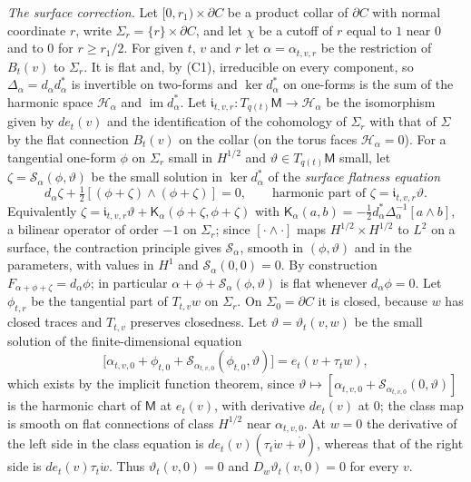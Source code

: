 \documentclass[11pt]{amsart}
\theoremstyle{definition}
\theoremstyle{remark}
\theoremstyle{plain}
\numberwithin{equation}{section}
\newcommand{\Msf}{\mathsf{M}}
\begin{document}
\emph{The surface correction.} Let $[0,r_1)\times\partial C$ be a product collar of $\partial C$
with normal coordinate $r$, write $\Sigma_r=\{r\}\times\partial C$, and let $\chi$ be a cutoff of
$r$ equal to $1$ near $0$ and to $0$ for $r\ge r_1/2$. For given $t$, $v$ and $r$ let
$\alpha=\alpha_{t,v,r}$ be the restriction of $B_t(v)$ to $\Sigma_r$. It is flat and, by (C1),
irreducible on every component, so $\Delta_\alpha=d_\alpha d_\alpha^*$ is invertible on
two-forms and $\ker d_\alpha^*$ on one-forms is the sum of the harmonic space $\mathcal H_\alpha$
and $\operatorname{im}d_\alpha^*$. Let $\mathfrak i_{t,v,r}\colon T_{q(t)}\Msf\to\mathcal H_\alpha$ be the
isomorphism given by $de_t(v)$ and the identification of the cohomology of $\Sigma_r$ with that
of $\Sigma$ by the flat connection $B_t(v)$ on the collar (on the torus faces $\mathcal
H_\alpha=0$). For a tangential one-form $\phi$ on $\Sigma_r$ small in $H^{1/2}$ and
$\vartheta\in T_{q(t)}\Msf$ small, let $\zeta=\mathcal S_\alpha(\phi,\vartheta)$ be the small
solution in $\ker d^*_\alpha$ of the \emph{surface flatness equation}
\begin{equation}\label{eq:surface-flatness}
d_\alpha\zeta+\tfrac12[(\phi+\zeta)\wedge(\phi+\zeta)]=0,\qquad
\text{harmonic part of }\zeta=\mathfrak i_{t,v,r}\vartheta .
\end{equation}
Equivalently $\zeta=\mathfrak i_{t,v,r}\vartheta+\mathsf K_\alpha(\phi+\zeta,\phi+\zeta)$ with
$\mathsf K_\alpha(a,b)=-\frac12d_\alpha^*\Delta_\alpha^{-1}[a\wedge b]$, a bilinear operator of order
$-1$ on $\Sigma_r$; since $[\cdot\wedge\cdot]$ maps $H^{1/2}\times H^{1/2}$ to $L^2$ on a
surface, the contraction principle gives $\mathcal S_\alpha$, smooth in $(\phi,\vartheta)$ and in
the parameters, with values in $H^1$ and $\mathcal S_\alpha(0,0)=0$. By construction
$F_{\alpha+\phi+\zeta}=d_\alpha\phi$; in particular $\alpha+\phi+\mathcal S_\alpha(\phi,\vartheta)$ is
flat whenever $d_\alpha\phi=0$. Let $\phi_{t,r}$ be the tangential part of $T_{t,v}w$ on
$\Sigma_r$. On $\Sigma_0=\partial C$ it is closed, because $w$ has closed traces and $T_{t,v}$
preserves closedness. Let $\vartheta=\vartheta_t(v,w)$ be the small solution of the
finite-dimensional equation
\begin{equation}\label{eq:class-equation}
\bigl[\alpha_{t,v,0}+\phi_{t,0}+\mathcal S_{\alpha_{t,v,0}}(\phi_{t,0},\vartheta)\bigr]=e_t(v+\tau_tw),
\end{equation}
which exists by the implicit function theorem, since $\vartheta\mapsto[\alpha_{t,v,0}+\mathcal
S_{\alpha_{t,v,0}}(0,\vartheta)]$ is the harmonic chart of $\Msf$ at $e_t(v)$, with derivative
$de_t(v)$ at $0$; the class map is smooth on flat connections of class $H^{1/2}$ near
$\alpha_{t,v,0}$. At $w=0$ the derivative of the left side in the class equation is
$de_t(v)(\tau_t\dot w+\dot\vartheta)$, whereas that of the right side
is $de_t(v)\tau_t\dot w$. Thus $\vartheta_t(v,0)=0$ and
$D_w\vartheta_t(v,0)=0$ for every $v$.
\end{document}
